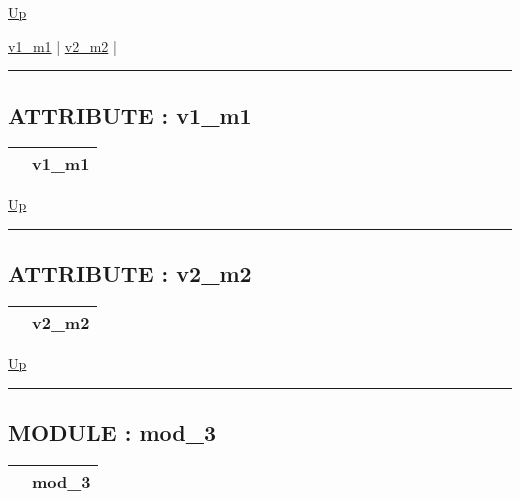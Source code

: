 \hyperlink{ecldoc:intest.inintest.example_2}{Up}

\par


\hyperlink{ecldoc:intest.inintest.example_2.mod_2.v1_m1}{v1\_m1}  |
\hyperlink{ecldoc:intest.inintest.example_2.mod_2.v2_m2}{v2\_m2}  |

\rule{\textwidth}{0.4pt}

\subsection*{ATTRIBUTE : v1\_m1}
\hypertarget{ecldoc:intest.inintest.example_2.mod_2.v1_m1}{}

{\renewcommand{\arraystretch}{1.5}
\begin{tabularx}{\textwidth}{|>{\raggedright\arraybackslash}l|X|}
\hline
\hspace{0pt} & v1\_m1 \\
\hline
\end{tabularx}
}

\hyperlink{ecldoc:intest.inintest.example_2.mod_2}{Up}

\par


\rule{\textwidth}{0.4pt}
\subsection*{ATTRIBUTE : v2\_m2}
\hypertarget{ecldoc:intest.inintest.example_2.mod_2.v2_m2}{}

{\renewcommand{\arraystretch}{1.5}
\begin{tabularx}{\textwidth}{|>{\raggedright\arraybackslash}l|X|}
\hline
\hspace{0pt} & v2\_m2 \\
\hline
\end{tabularx}
}

\hyperlink{ecldoc:intest.inintest.example_2.mod_2}{Up}

\par


\rule{\textwidth}{0.4pt}


\subsection*{MODULE : mod\_3}
\hypertarget{ecldoc:intest.inintest.example_2.mod_3}{}

{\renewcommand{\arraystretch}{1.5}
\begin{tabularx}{\textwidth}{|>{\raggedright\arraybackslash}l|X|}
\hline
\hspace{0pt} & mod\_3 \\
\hline
\end{tabularx}
}

